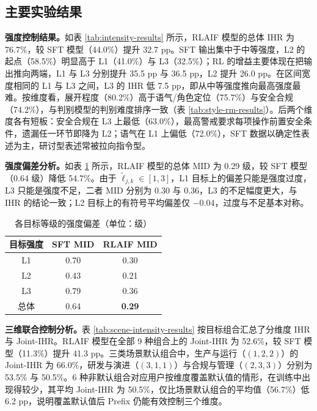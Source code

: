 \documentclass[fontset=fandol,type=master,campus=shenzhen,etitleauto=true]{hithesisbook}
\begin{document}
\subsection{主要实验结果}\label{ux4e3bux8981ux7ed3ux679c-1}

\textbf{强度控制结果。}如表 \ref{tab:intensity-results} 所示，RLAIF 模型的总体 IHR 为 76.7\%，较 SFT 模型（44.0\%）提升 32.7 pp。SFT 输出集中于中等强度，L2 的起点（58.5\%）明显高于 L1（41.0\%）与 L3（32.5\%）；RL 的增益主要体现在把输出推向两端，L1 与 L3 分别提升 35.5 pp 与 36.5 pp，L2 提升 26.0 pp。在区间宽度相同的 L1 与 L3 之间，L3 的 IHR 低 7.5 pp，即从中等强度推向最高强度最难。按维度看，展开程度（80.2\%）高于语气/角色定位（75.7\%）与安全合规（74.2\%），与判别模型的判别难度排序一致（表 \ref{tab:style-rm-results}）。后两个维度各有短板：安全合规在 L3 上最低（63.0\%），最高警戒要求每项操作前置安全条件，遗漏任一环节即降为 L2；语气在 L1 上偏低（72.0\%），SFT 数据以确定性表述为主，研讨型表述常被拉向指令型。

\textbf{强度偏差分析。}如表 \ref{tab:intensity-mid} 所示，RLAIF 模型的总体 MID 为 0.29 级，较 SFT 模型（0.64 级）降低 54.7\%。由于 $\tilde{\ell}_{j,k} \in [1, 3]$，L1 目标上的偏差只能是强度过度，L3 只能是强度不足，二者 MID 分别为 0.30 与 0.36，L3 的不足幅度更大，与 IHR 的结论一致；L2 目标上的有符号平均偏差仅 $-0.04$，过度与不足基本对称。

\begin{table}[htbp]
\centering
\caption{各目标等级的强度偏差（单位：级）}
\label{tab:intensity-mid}
\small
\renewcommand{\arraystretch}{1.15}
\begin{tabular}{c c c}
\toprule
\textbf{目标强度} & \textbf{SFT MID} & \textbf{RLAIF MID} \\
\midrule
L1 & 0.70 & 0.30 \\
L2 & 0.43 & 0.21 \\
L3 & 0.79 & 0.36 \\
\midrule
总体 & 0.64 & \textbf{0.29} \\
\bottomrule
\end{tabular}
\end{table}

\textbf{三维联合控制分析。}表 \ref{tab:scene-intensity-results} 按目标组合汇总了分维度 IHR 与 Joint-IHR。RLAIF 模型在全部 9 种组合上的 Joint-IHR 为 52.6\%，较 SFT 模型（11.3\%）提升 41.3 pp。三类场景默认组合中，生产与运行（$(1,2,2)$）的 Joint-IHR 为 66.0\%，研发与演进（$(3,1,1)$）与合规与管理（$(2,3,3)$）分别为 53.5\% 与 50.5\%。6 种非默认组合对应用户按维度覆盖默认值的情形，在训练中出现得较少，其平均 Joint-IHR 为 50.5\%，仅比场景默认组合的平均值（56.7\%）低 6.2 pp，说明覆盖默认值后 Prefix 仍能有效控制三个维度。
\end{document}
